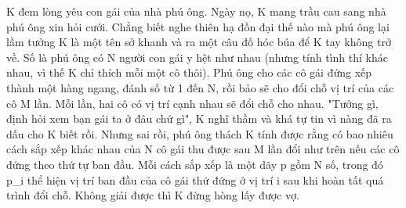 K đem lòng yêu con gái của nhà phú ông. Ngày nọ, K mang trầu cau sang nhà phú ông xin hỏi cưới. Chẳng biết nghe thiên hạ đồn đại thế nào mà phú ông lại lầm tưởng K là một tên sở khanh và ra một câu đố hóc búa để K tay không trở về. Số là phú ông có N người con gái y hệt như nhau (nhưng tính tình thí khác nhau, vì thế K chỉ thích mỗi một cô thôi). Phú ông cho các cô gái đứng xếp thành một hàng ngang, đánh số từ 1 đến N, rồi bảo sẽ cho đổi chỗ vị trí của các cô M lần. Mỗi lần, hai cô có vị trí cạnh nhau sẽ đổi chỗ cho nhau. "Tưởng gì, định hỏi xem bạn gái ta ở đâu chứ gì", K nghĩ thầm và khá tự tin vì nàng đã ra dấu cho K biết rồi. Nhưng sai rồi, phú ông thách K tính được rằng có bao nhiêu cách sắp xếp khác nhau của N cô gái thu được sau M lần đổi như trên nếu các cô đứng theo thứ tự ban đầu. Mỗi cách sắp xếp là một dãy p gồm N số, trong đó p\_i thể hiện vị trí ban đầu của cô gái thứ đứng ở vị trí i sau khi hoàn tất quá trình đổi chỗ. Không giải được thì K đừng hòng lấy được vợ.